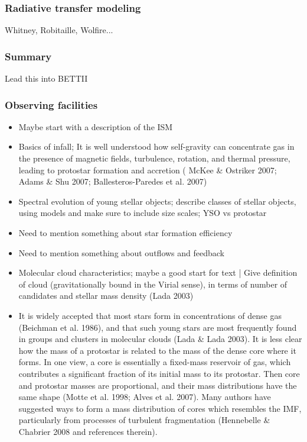 \subsubsection{Radiative transfer modeling}
\label{subsubsec:radiative}
Whitney, Robitaille, Wolfire...

\subsubsection{Summary}

Lead this into BETTII

\subsubsection{Observing facilities}


\begin{itemize}
\item \citep{Kennicutt:2012ey} Maybe start with a description of the ISM
\item \citep{Terebey:1984hi} Basics of infall; 
It is well understood how self-gravity can concentrate gas in the presence of magnetic fields, turbulence, rotation, and thermal pressure, leading to protostar formation and accretion ( McKee \& Ostriker 2007; Adams \& Shu 2007; Ballesteros-Paredes et al. 2007)
\item \citep{Adams:1987gy} Spectral evolution of young stellar objects; describe classes of stellar objects, using models and make sure to include size scales; YSO vs protostar
\item Need to mention something about star formation efficiency
\item Need to mention something about outflows and feedback \citep{Maury:2009co}
\item \citep{Larson:1994cj} Molecular cloud characteristics; maybe a good start for text | Give definition of cloud (gravitationally bound in the Virial sense), in terms of number of candidates and stellar mass density (Lada 2003)
\item \citep{Myers:2009fv} It is widely accepted that most stars form in concentrations of dense gas (Beichman et al. 1986), and that such young stars are most frequently found in groups and clusters in molecular clouds (Lada \& Lada 2003). It is less clear how the mass of a protostar is related to the mass of the dense core where it forms.
In one view, a core is essentially a fixed-mass reservoir of gas, which contributes a significant fraction of its initial mass to its protostar. Then core and protostar masses are proportional, and their mass distributions have the same shape (Motte et al. 1998; Alves et al. 2007). Many authors have suggested ways to form a mass distribution of cores which resembles the IMF, particularly from processes of turbulent fragmentation (Hennebelle \& Chabrier 2008 and references therein).

\end{itemize}
